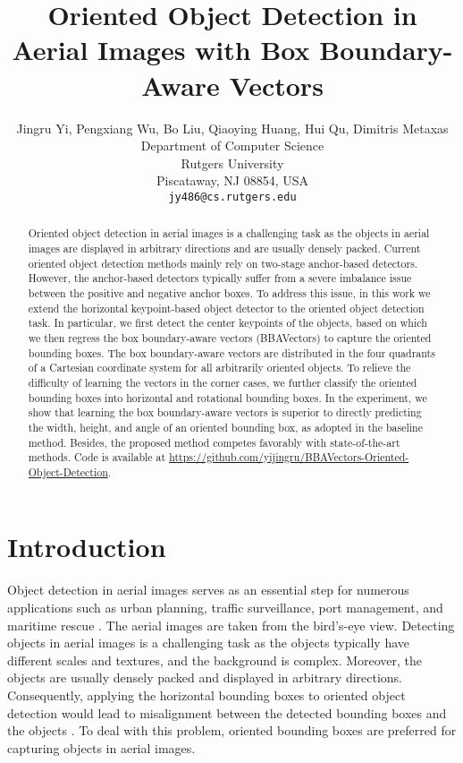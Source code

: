 \documentclass[10pt,twocolumn,letterpaper]{article}
\begin{document}
\title{Oriented Object Detection in Aerial Images with Box Boundary-Aware Vectors}

\author{Jingru Yi, Pengxiang Wu, Bo Liu, Qiaoying Huang, Hui Qu, Dimitris Metaxas\\
Department of Computer Science\\
Rutgers University\\
Piscataway, NJ 08854, USA\\
{\tt\small jy486@cs.rutgers.edu}
}

\maketitle


\begin{abstract}
    Oriented object detection in aerial images is a challenging task as the objects in aerial images are displayed in arbitrary directions and are usually densely packed. Current oriented object detection methods mainly rely on two-stage anchor-based detectors. However, the anchor-based detectors typically suffer from a severe imbalance issue between the positive and negative anchor boxes. To address this issue, in this work we extend the horizontal keypoint-based object detector to the oriented object detection task. In particular, we first detect the center keypoints of the objects, based on which we then regress the box boundary-aware vectors (BBAVectors) to capture the oriented bounding boxes. The box boundary-aware vectors are distributed in the four quadrants of a Cartesian coordinate system for all arbitrarily oriented objects. To relieve the difficulty of learning the vectors in the corner cases, we further classify the oriented bounding boxes into horizontal and rotational bounding boxes. In the experiment, we show that learning the box boundary-aware vectors is superior to directly predicting the width, height, and angle of an oriented bounding box, as adopted in the baseline method. Besides, the proposed method competes favorably with state-of-the-art methods. Code is available at \url{https://github.com/yijingru/BBAVectors-Oriented-Object-Detection}.
\end{abstract}

\section{Introduction}
\label{Introduction}
Object detection in aerial images serves as an essential step for numerous applications such as urban planning, traffic surveillance,  port management, and maritime rescue \cite{azimi2018towards,zhang2018toward}. The aerial images are taken from the bird's-eye view. Detecting objects in aerial images is a challenging task as the objects typically have different scales and textures, and the background is complex. Moreover, the objects are usually densely packed and displayed in arbitrary directions. Consequently, applying the horizontal bounding boxes to oriented object detection would lead to misalignment between the detected bounding boxes and the objects \cite{ding2019learning}. To deal with this problem, oriented bounding boxes are preferred for capturing objects in aerial images.
\end{document}
